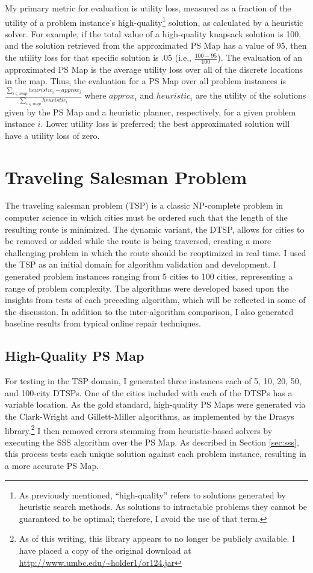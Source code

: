 My primary metric for evaluation is utility loss, measured as a fraction of the utility of a problem instance's high-quality\footnote{As previously mentioned, ``high-quality'' refers to solutions generated by heuristic search methods.  As solutions to intractable problems they cannot be guaranteed to be optimal; therefore, I avoid the use of that term.} solution, as calculated by a heuristic solver.  For example, if the total value of a high-quality knapsack solution is 100, and the solution retrieved from the approximated PS Map has a value of 95, then the utility loss for that specific solution is .05 (i.e., $\frac{100-95}{100}$).  The evaluation of an approximated PS Map is the average utility loss over all of the discrete locations in the map.  Thus, the evaluation for a PS Map over all problem instances is $\frac{\sum_{i \in map}heuristic_i-approx_i}{\sum_{i \in map}heuristic_i}$ where $approx_i$ and $heuristic_i$ are the utility of the solutions given by the PS Map and a heuristic planner, respectively, for a given problem instance $i$.  Lower utility loss is preferred; the best approximated solution will have a utility loss of zero.


\section{Traveling Salesman Problem}

The traveling salesman problem (TSP) is a classic NP-complete problem in computer science in which cities must be ordered such that the length of the resulting route is minimized.  The dynamic variant, the DTSP, allows for cities to be removed or added while the route is being traversed, creating a more challenging problem in which the route should be reoptimized in real time.  I used the TSP as an initial domain for algorithm validation and development.  I generated problem instances ranging from 5 cities to 100 cities, representing a range of problem complexity.  The algorithms were developed based upon the insights from tests of  each preceding algorithm, which will be reflected in some of the discussion.  In addition to the inter-algorithm comparison, I also generated baseline results from typical online repair techniques.

\subsection{High-Quality PS Map} For testing in the TSP domain, I generated three instances each of 5, 10, 20, 50, and 100-city DTSPs.  One of the cities included with each of the DTSPs has a  variable location.  As the gold standard, high-quality PS Maps were generated via the Clark-Wright \citep{clarke64scheduling} and Gillett-Miller \citep{gillett74heuristic} algorithms, as implemented by the Drasys library.\footnote{As of this writing, this library appears to no longer be publicly available.  I have placed a copy of the original download at  \url{http://www.umbc.edu/~holder1/or124.jar}}  I then removed errors stemming from heuristic-based solvers by executing the SSS algorithm over the PS Map.  As described in Section \ref{sec:sss}, this process tests each unique solution against each problem instance, resulting in a more accurate PS Map.  


